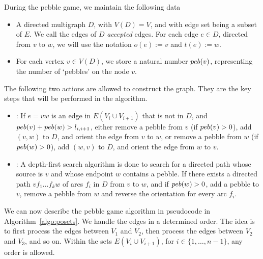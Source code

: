 \documentclass{article}
\begin{document}
During the pebble game, we maintain the following data
\begin{itemize}
\item A directed multigraph $D$, with $V(D)=V$, and with edge set being a subset of $E$. We call the edges of $D$ \emph{accepted} edges. For each edge $e\in D$, directed from $v$ to $w$, we will use the notation $o(e) := v$ and $t(e):=w$.
\item For each vertex $v\in V(D)$, we store a natural number $\peb(v)$, representing the number of `pebbles' on the node $v$.
\end{itemize}
The following two actions are allowed to construct the graph. They are the key steps that will be performed in the algorithm.
\begin{itemize}
\item{: If $e=vw$ is an edge in $E(V_i \cup V_{i+1})$ that is not in $D$, and $\peb(v)+\peb(w)>l_{i,i+1}$, either
remove a pebble from $v$ (if $\peb(v) > 0$), add $(v,w)$ to $D$, and orient the edge from $v$ to $w$, or remove a pebble from $w$ (if $\peb(w) > 0$), add $(w,v)$ to $D$, and orient the edge from $w$ to $v$.} 
\item{: A depth-first search algorithm is done to search for a directed path whose source is $v$ and whose endpoint $w$ contains a pebble. If there exists a directed path $vf_1\dots f_kw$ of arcs $f_i$ in $D$ from $v$ to $w$, and if $\peb(w)>0$,  add a pebble to $v$, remove a pebble from $w$ and reverse the orientation for every arc $f_i$.}

\end{itemize}

We can now describe the pebble game algorithm in pseudocode in Algorithm~\ref{algo:posets}. We handle the edges in a determined order. The idea is to first process the edges between $V_1$ and $V_2$, then process the edges between $V_2$ and $V_3$, and so on. Within the sets $E(V_{i}\cup V_{i+1})$, for $i \in \{1, \dots, n-1\}$, any order is allowed.
\end{document}
